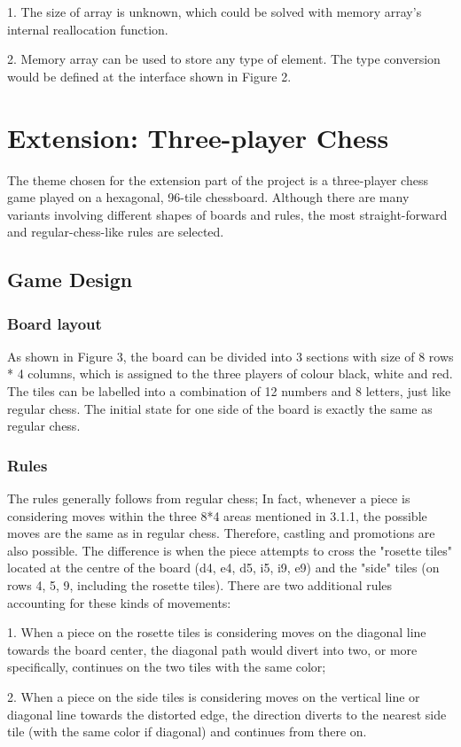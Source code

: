 \documentclass[10pt]{article}
\begin{document}
1. The size of array is unknown, which could be solved with memory array's internal reallocation function.
    
2. Memory array can be used to store any type of element. The type conversion would be defined at the interface shown in Figure 2.
\pagebreak
\section{Extension: Three-player Chess}
The theme chosen for the extension part of the project is a three-player chess game played on a hexagonal, 96-tile chessboard. Although there are many variants involving different shapes of boards and rules, the most straight-forward and regular-chess-like rules are selected.
\subsection{Game Design}
\subsubsection{Board layout}
As shown in Figure 3, the board can be divided into 3 sections with size of 8 rows * 4 columns, which is assigned to the three players of colour black, white and red. The tiles can be labelled into a combination of 12 numbers and 8 letters, just like regular chess. The initial state for one side of the board is exactly the same as regular chess.
\subsubsection{Rules}
The rules generally follows from regular chess; In fact, whenever a piece is considering moves within the three 8*4 areas mentioned in 3.1.1, the possible moves are the same as in regular chess. Therefore, castling and promotions are also possible. The difference is when the piece attempts to cross the "rosette tiles" located at the centre of the board (d4, e4, d5, i5, i9, e9) and the "side" tiles (on rows 4, 5, 9, including the rosette tiles). There are two additional rules accounting for these kinds of movements:

1. When a piece on the rosette tiles is considering moves on the diagonal line towards the board center, the diagonal path would divert into two, or more specifically, continues on the two tiles with the same color;

2. When a piece on the side tiles is considering moves on the vertical line or diagonal line towards the distorted edge, the direction diverts to the nearest side tile (with the same color if diagonal) and continues from there on.
\end{document}
